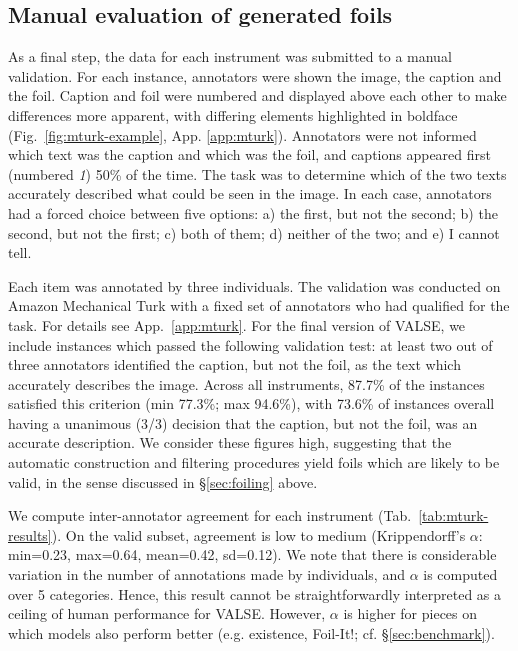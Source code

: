 \documentclass[11pt]{article}
\newcommand{\dataset}{VALSE}
\begin{document}
\subsection{Manual evaluation of generated foils}\label{sec:mturk}
As a final step, the data for each instrument was submitted to a manual validation.
For each instance, annotators were shown the image, the caption and the foil. Caption and foil were numbered and displayed above each other to make differences more apparent, 
with differing elements highlighted in boldface (Fig.\ \ref{fig:mturk-example}, App. \ref{app:mturk}).
Annotators were not informed which text was the caption and which was the foil, and captions appeared first (numbered {\em 1}) 50\% of the time. The task was to determine which of the two texts accurately described what could be seen in the image. In each case, annotators had a forced choice between five options: a) the first, but not the second; b) the second, but not the first; c) both of them; d) neither of the two; and e) I cannot tell.

Each item was annotated by three individuals. The validation was conducted on Amazon Mechanical Turk with a fixed set of annotators who had qualified for the task.
For details see  App.\ \ref{app:mturk}.
For the final version of \dataset{}, we include instances which passed the following validation test: 
at least two out of three annotators identified the caption, but not the foil, as the text which accurately describes the image. Across all instruments, 87.7\% of the instances satisfied this criterion (min 77.3\%; max 94.6\%),
with 73.6\% of instances overall having a unanimous (3/3) decision that the caption, but not the foil, was an accurate description. We consider these figures high, suggesting that the automatic construction and filtering procedures yield foils which are likely to be valid, in the sense discussed in \S\ref{sec:foiling} above. 

We compute inter-annotator agreement for each instrument (Tab.~\ref{tab:mturk-results}). On the valid subset, agreement is low to medium (Krippendorff's $\alpha$: min=0.23, max=0.64, mean=0.42, sd=0.12). We note that there is considerable variation in the number of annotations made by individuals, and $\alpha$ is computed over 5 categories. Hence, this result cannot be straightforwardly interpreted as a ceiling of human performance for \dataset{}. However, $\alpha$ is higher for pieces on which models also perform better (e.g. existence, Foil-It!; cf. \S \ref{sec:benchmark}).
\end{document}
